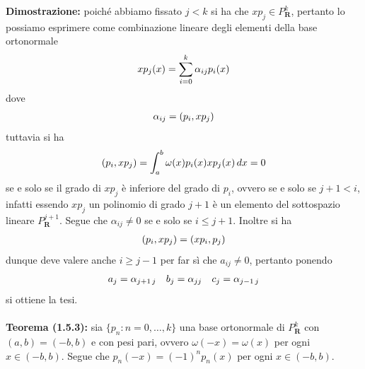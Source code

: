 \documentclass{article}
\begin{document}
\textbf{Dimostrazione:} poiché abbiamo fissato $j < k$ si ha che $xp_j \in P^k_\mathbf{R}$, pertanto lo possiamo esprimere come combinazione lineare degli elementi della base ortonormale
\begin{gather}
    xp_j(x) = \sum_{i = 0}^k \alpha_{ij}p_i(x) \notag
\end{gather}
dove
\begin{gather}
    \alpha_{ij} = (p_i, xp_j) \notag
\end{gather}
tuttavia si ha
\begin{gather}
    (p_i, xp_j) = \int_a^b \omega(x)p_i(x)xp_j(x) \, dx = 0 \notag
\end{gather}
se e solo se il grado di $xp_j$ è inferiore del grado di $p_i$, ovvero se e solo se $j + 1 < i$, infatti essendo $xp_j$ un polinomio di grado $j + 1$ è un elemento del sottospazio lineare $P^{j + 1}_\mathbf{R}$. Segue che $\alpha_{ij} \neq 0$ se e solo se $i \leq j + 1$. Inoltre si ha
\begin{align}
    (p_i, xp_j) = (xp_i, p_j) \notag
\end{align}
dunque deve valere anche $i \geq j - 1$ per far sì che $a_{ij} \neq 0$, pertanto ponendo
\begin{gather}
    a_j = \alpha_{j + 1 \, j} \quad b_j = \alpha_{jj} \quad c_j = \alpha_{j - 1 \, j} \notag
\end{gather}
si ottiene la tesi. \\ \\
\textbf{Teorema (1.5.3):} sia $\{p_n : n = 0, \dots, k\}$ una base ortonormale di $P^k_\mathbf{R}$ con $(a, b) = (-b, b)$ e con pesi pari, ovvero $\omega(-x) = \omega(x)$ per ogni $x \in (-b, b)$. Segue che $p_n(-x) = (-1)^np_n(x)$ per ogni $x \in (-b, b)$. \\
\end{document}
